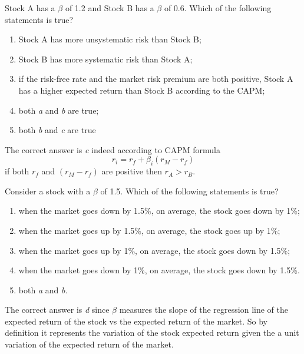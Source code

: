\begin{Exercise}[title={(CAPM Multianswer I)}]
Stock A has a $\beta$ of 1.2 and Stock B has a $\beta$ of 0.6. Which of the following statements is true? 
\begin{enumerate}[label=\emph{\alph*})]
\item Stock A has more unsystematic risk than Stock B;
\item Stock B has more systematic risk than Stock A; 
\item if the risk-free rate and the market risk premium are both positive, Stock A has a higher expected return than Stock B according to the CAPM;
\item both \emph{a} and \emph{b} are true;
\item both \emph{b} and \emph{c} are true
\end{enumerate}
\end{Exercise}
\begin{Answer}
The correct answer is \emph{c} indeed according to CAPM formula
\[r_i = r_f + \beta_i (r_M - r_f)\]
if both $r_f$ and $(r_M - r_f)$ are positive then $r_A \gt r_B$.
\end{Answer}	

\begin{Exercise}[title={(CAPM Multianswer II)}]
Consider a stock with a $\beta$ of 1.5. Which of the following statements is true?
 
\begin{enumerate}[label=\emph{\alph*}]
\item when the market goes down by 1.5\%, on average, the stock goes down by 1\%;
\item when the market goes up by 1.5\%, on average, the stock goes up by 1\%;
\item when the market goes up by 1\%, on average, the stock goes down by 1.5\%;
\item when the market goes down by 1\%, on average, the stock goes down by 1.5\%. 
\item both \emph{a} and \emph{b}.	
\end{enumerate}
\end{Exercise}
\begin{Answer}
The correct answer is \emph{d} since $\beta$ measures the slope of the regression line of the expected return of the stock vs the expected return of the market. So by definition it represents the variation of the stock expected return given the a unit variation of the expected return of the market.
\end{Answer}	

